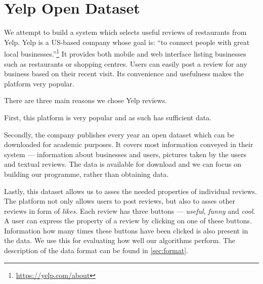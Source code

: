 \chapter{Yelp Open Dataset}
\label{app:yelp_data}

We attempt to build a system which selects useful reviews of restaurants from Yelp.
Yelp is a US-based company whose goal is: ``to connect people with great local businesses.''\footnote{\url{https://yelp.com/about}}
It provides both mobile and web interface listing businesses such as restaurants or shopping centres.
Users can easily post a review for any business based on their recent visit.
Its convenience and usefulness makes the platform very popular.

There are three main reasons we chose Yelp reviews.

First, this platform is very popular and as such has sufficient data.

Secondly, the company publishes every year an open dataset which can be downloaded for academic
purposes.
It covers most information conveyed in their system ---  information about businesses and users, pictures taken by the users and textual reviews.
The data is available for download and we can focus on building our programme, rather than obtaining data.

Lastly, this dataset allows us to asses the needed properties of individual reviews.
The platform not only allows users to post reviews, but also to asses other reviews in form of \emph{likes}.
Each review has three buttons --- \emph{useful}, \emph{funny} and \emph{cool}.
A user can express the property of a review by clicking on one of these buttons.
Information how many times these buttons have been clicked is also present in the data.
We use this for evaluating how well our algorithms perform.
The description of the data format can be found in \autoref{sec:format}.
